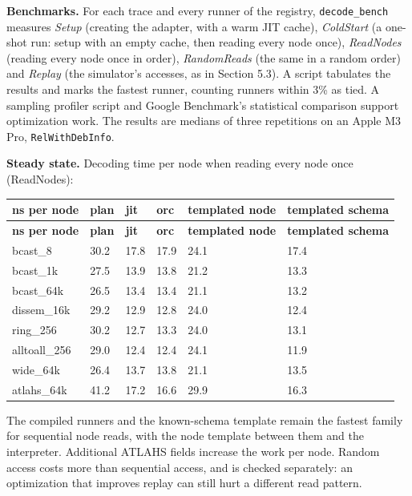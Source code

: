 \documentclass[10pt,a4paper]{article}
\begin{document}
\textbf{Benchmarks.} For each trace and every runner of the registry, \texttt{decode\_\allowbreak{}bench} measures \emph{Setup} (creating the adapter, with a warm JIT cache), \emph{ColdStart} (a one-shot run: setup with an empty cache, then reading every node once), \emph{ReadNodes} (reading every node once in order), \emph{RandomReads} (the same in a random order) and \emph{Replay} (the simulator's accesses, as in Section 5.3). A script tabulates the results and marks the fastest runner, counting runners within 3\% as tied. A sampling profiler script and Google Benchmark's statistical comparison support optimization work. The results are medians of three repetitions on an Apple M3 Pro, \texttt{RelWithDebInfo}.

\textbf{Steady state.} Decoding time per node when reading every node once (ReadNodes):

{\small
\begin{longtable}{P{0.17\dimexpr{}\tabcolsep\relax}P{0.11\dimexpr{}\tabcolsep\relax}P{0.11\dimexpr{}\tabcolsep\relax}P{0.11\dimexpr{}\tabcolsep\relax}P{0.2\dimexpr{}\tabcolsep\relax}P{0.2\dimexpr{}\tabcolsep\relax}}
\toprule
\textbf{ns per node} & \textbf{plan} & \textbf{jit} & \textbf{orc} & \textbf{templated node} & \textbf{templated schema} \\
\midrule
\endfirsthead
\toprule
\textbf{ns per node} & \textbf{plan} & \textbf{jit} & \textbf{orc} & \textbf{templated node} & \textbf{templated schema} \\
\midrule
\endhead
\bottomrule
\endfoot
bcast\_8 & 30.2 & 17.8 & 17.9 & 24.1 & 17.4 \\
bcast\_1k & 27.5 & 13.9 & 13.8 & 21.2 & 13.3 \\
bcast\_64k & 26.5 & 13.4 & 13.4 & 21.1 & 13.2 \\
dissem\_16k & 29.2 & 12.9 & 12.8 & 24.0 & 12.4 \\
ring\_256 & 30.2 & 12.7 & 13.3 & 24.0 & 13.1 \\
alltoall\_256 & 29.0 & 12.4 & 12.4 & 24.1 & 11.9 \\
wide\_64k & 26.4 & 13.7 & 13.8 & 21.1 & 13.5 \\
atlahs\_64k & 41.2 & 17.2 & 16.6 & 29.9 & 16.3 \\
\end{longtable}
}

The compiled runners and the known-schema template remain the fastest family for sequential node reads, with the node template between them and the interpreter. Additional ATLAHS fields increase the work per node. Random access costs more than sequential access, and is checked separately: an optimization that improves replay can still hurt a different read pattern.
\end{document}
